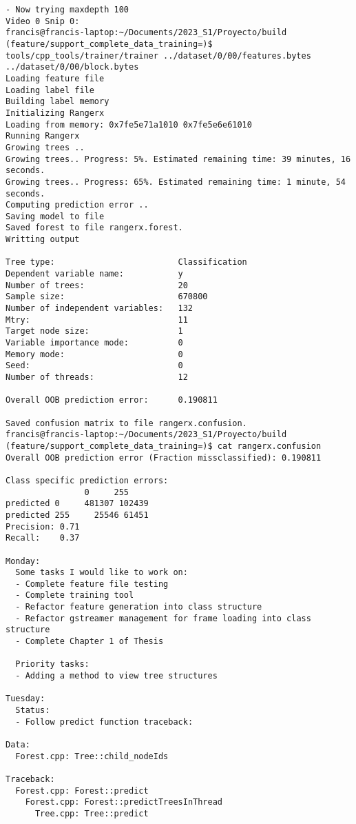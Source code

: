 \documentclass[12pt,oneside]{book}
\begin{document}
\begin{lstlisting}
- Now trying maxdepth 100
Video 0 Snip 0:
francis@francis-laptop:~/Documents/2023_S1/Proyecto/build (feature/support_complete_data_training=)$ tools/cpp_tools/trainer/trainer ../dataset/0/00/features.bytes ../dataset/0/00/block.bytes 
Loading feature file
Loading label file
Building label memory
Initializing Rangerx
Loading from memory: 0x7fe5e71a1010 0x7fe5e6e61010
Running Rangerx
Growing trees ..
Growing trees.. Progress: 5%. Estimated remaining time: 39 minutes, 16 seconds.
Growing trees.. Progress: 65%. Estimated remaining time: 1 minute, 54 seconds.
Computing prediction error ..
Saving model to file
Saved forest to file rangerx.forest.
Writting output

Tree type:                         Classification
Dependent variable name:           y
Number of trees:                   20
Sample size:                       670800
Number of independent variables:   132
Mtry:                              11
Target node size:                  1
Variable importance mode:          0
Memory mode:                       0
Seed:                              0
Number of threads:                 12

Overall OOB prediction error:      0.190811

Saved confusion matrix to file rangerx.confusion.
francis@francis-laptop:~/Documents/2023_S1/Proyecto/build (feature/support_complete_data_training=)$ cat rangerx.confusion 
Overall OOB prediction error (Fraction missclassified): 0.190811

Class specific prediction errors:
                0     255
predicted 0     481307 102439 
predicted 255     25546 61451
Precision: 0.71
Recall:    0.37

Monday:
  Some tasks I would like to work on:
  - Complete feature file testing
  - Complete training tool
  - Refactor feature generation into class structure
  - Refactor gstreamer management for frame loading into class structure
  - Complete Chapter 1 of Thesis

  Priority tasks:
  - Adding a method to view tree structures

Tuesday:
  Status:
  - Follow predict function traceback:

Data:
  Forest.cpp: Tree::child_nodeIds

Traceback:
  Forest.cpp: Forest::predict
    Forest.cpp: Forest::predictTreesInThread
      Tree.cpp: Tree::predict

\end{lstlisting}



  \printbibliography[title={Bibliografía},heading=bibintoc]
\end{document}
